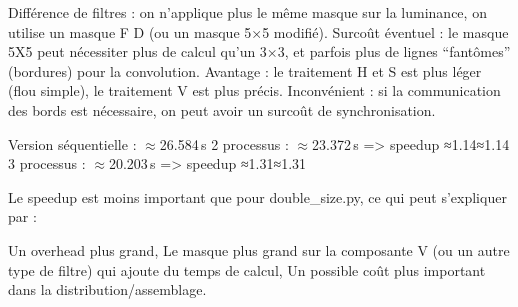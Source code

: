 \documentclass[a4paper,13pt]{book}
\begin{document}
        Différence de filtres : on n’applique plus le même masque sur la luminance, on utilise un masque F D (ou un masque 5×5 modifié).
        Surcoût éventuel : le masque 5X5 peut nécessiter plus de calcul qu’un 3×3, et parfois plus de lignes “fantômes” (bordures) pour la convolution.
        Avantage : le traitement H et S est plus léger (flou simple), le traitement V est plus précis.
        Inconvénient : si la communication des bords est nécessaire, on peut avoir un surcoût de synchronisation.

    
        Version séquentielle : $\approx$26.584 s
        2 processus : $\approx$23.372 s => speedup ≈1.14≈1.14
        3 processus : $\approx$20.203 s => speedup ≈1.31≈1.31
    
    Le speedup est moins important que pour double_size.py, ce qui peut s’expliquer par :
    
        Un overhead plus grand,
        Le masque plus grand sur la composante V (ou un autre type de filtre) qui ajoute du temps de calcul,
        Un possible coût plus important dans la distribution/assemblage.
\end{document}
